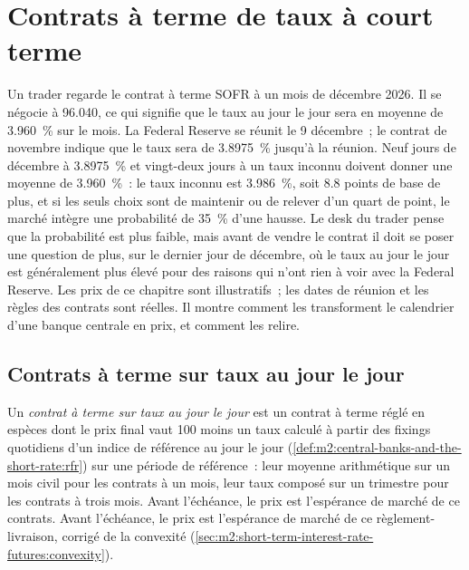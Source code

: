 \chapter{Contrats à terme de taux à court terme}\label{ch:m2:short-term-interest-rate-futures}

Un trader regarde le contrat à terme SOFR à un mois de décembre 2026. Il se négocie à 96.040,
ce qui signifie que le taux au jour le jour sera en moyenne de 3.960~\% sur le mois. La
Federal Reserve se réunit le 9 décembre~; le contrat de novembre indique que le taux
sera de 3.8975~\% jusqu'à la réunion. Neuf jours de décembre à 3.8975~\% et
vingt-deux jours à un taux inconnu doivent donner une moyenne de 3.960~\%~: le taux inconnu est
3.986~\%, soit 8.8 points de base de plus, et si les seuls choix sont de maintenir ou de
relever d'un quart de point, le marché intègre une probabilité de 35~\% d'une hausse. Le
desk du trader pense que la probabilité est plus faible, mais avant de vendre le contrat il
doit se poser une question de plus, sur le dernier jour de décembre, où le
taux au jour le jour est généralement plus élevé pour des raisons qui n'ont rien à voir avec la
Federal Reserve. Les prix de ce chapitre sont illustratifs~; les dates de réunion
et les règles des contrats sont réelles. Il montre comment les 
transforment le calendrier d'une banque centrale en prix, et comment les relire.

\section{Contrats à terme sur taux au jour le jour}

\begin{definition}\label{def:m2:short-term-interest-rate-futures:future}
Un \emph{contrat à terme sur taux au jour le jour} est un contrat à terme réglé en espèces
dont le prix final vaut 100 moins un taux calculé à partir des fixings
quotidiens d'un indice de référence au jour le jour (\cref{def:m2:central-banks-and-the-short-rate:rfr})
sur une période de référence~: leur moyenne arithmétique sur un mois civil pour
les contrats à un mois, leur taux composé sur un trimestre pour les contrats à trois mois. Avant l'échéance, le prix est l'espérance de marché de ce
contrats. Avant l'échéance, le prix est l'espérance de marché de ce
règlement-livraison, corrigé de la convexité (\cref{sec:m2:short-term-interest-rate-futures:convexity}).
\end{definition}

